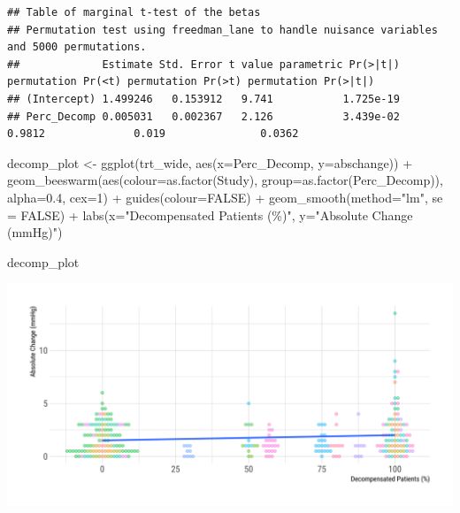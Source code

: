 \documentclass[
]{article}
\newenvironment{Shaded}{\begin{snugshade}}{\end{snugshade}}
\newcommand{\AttributeTok}[1]{\textcolor[rgb]{0.77,0.63,0.00}{#1}}
\newcommand{\ConstantTok}[1]{\textcolor[rgb]{0.00,0.00,0.00}{#1}}
\newcommand{\DecValTok}[1]{\textcolor[rgb]{0.00,0.00,0.81}{#1}}
\newcommand{\FloatTok}[1]{\textcolor[rgb]{0.00,0.00,0.81}{#1}}
\newcommand{\FunctionTok}[1]{\textcolor[rgb]{0.00,0.00,0.00}{#1}}
\newcommand{\NormalTok}[1]{#1}
\newcommand{\OtherTok}[1]{\textcolor[rgb]{0.56,0.35,0.01}{#1}}
\newcommand{\SpecialCharTok}[1]{\textcolor[rgb]{0.00,0.00,0.00}{#1}}
\newcommand{\StringTok}[1]{\textcolor[rgb]{0.31,0.60,0.02}{#1}}
\begin{document}
\begin{verbatim}
## Table of marginal t-test of the betas
## Permutation test using freedman_lane to handle nuisance variables and 5000 permutations.
##             Estimate Std. Error t value parametric Pr(>|t|) permutation Pr(<t) permutation Pr(>t) permutation Pr(>|t|)
## (Intercept) 1.499246   0.153912   9.741           1.725e-19                                                           
## Perc_Decomp 0.005031   0.002367   2.126           3.439e-02             0.9812              0.019               0.0362
\end{verbatim}

\begin{Shaded}
\begin{Highlighting}[]
\NormalTok{decomp\_plot }\OtherTok{\textless{}{-}} \FunctionTok{ggplot}\NormalTok{(trt\_wide, }\FunctionTok{aes}\NormalTok{(}\AttributeTok{x=}\NormalTok{Perc\_Decomp, }\AttributeTok{y=}\NormalTok{abschange)) }\SpecialCharTok{+}
  \FunctionTok{geom\_beeswarm}\NormalTok{(}\FunctionTok{aes}\NormalTok{(}\AttributeTok{colour=}\FunctionTok{as.factor}\NormalTok{(Study), }
                    \AttributeTok{group=}\FunctionTok{as.factor}\NormalTok{(Perc\_Decomp)),}
                \AttributeTok{alpha=}\FloatTok{0.4}\NormalTok{, }\AttributeTok{cex=}\DecValTok{1}\NormalTok{) }\SpecialCharTok{+}
  \FunctionTok{guides}\NormalTok{(}\AttributeTok{colour=}\ConstantTok{FALSE}\NormalTok{) }\SpecialCharTok{+} 
  \FunctionTok{geom\_smooth}\NormalTok{(}\AttributeTok{method=}\StringTok{"lm"}\NormalTok{, }\AttributeTok{se =} \ConstantTok{FALSE}\NormalTok{) }\SpecialCharTok{+}
  \FunctionTok{labs}\NormalTok{(}\AttributeTok{x=}\StringTok{"Decompensated Patients (\%)"}\NormalTok{,}
       \AttributeTok{y=}\StringTok{"Absolute Change (mmHg)"}\NormalTok{)}

\NormalTok{decomp\_plot}
\end{Highlighting}
\end{Shaded}

\includegraphics{figures/unnamed-chunk-34-1.png}
\end{document}
